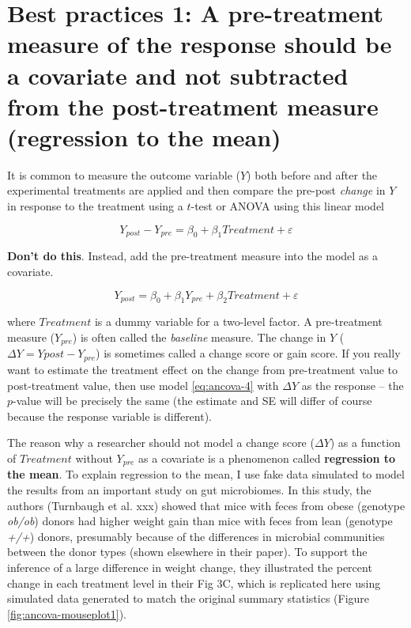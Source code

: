 \documentclass[]{book}
\begin{document}
\section{Best practices 1: A pre-treatment measure of the response
should be a covariate and not subtracted from the post-treatment measure
(regression to the
mean)}\label{best-practices-1-a-pre-treatment-measure-of-the-response-should-be-a-covariate-and-not-subtracted-from-the-post-treatment-measure-regression-to-the-mean}

It is common to measure the outcome variable (\(Y\)) both before and
after the experimental treatments are applied and then compare the
pre-post \emph{change} in \(Y\) in response to the treatment using a
\(t\)-test or ANOVA using this linear model

\begin{equation}
Y_{post}-Y_{pre} = \beta_0 + \beta_1 Treatment + \varepsilon
\label{eq:cov-change-score}
\end{equation}

\textbf{Don't do this}. Instead, add the pre-treatment measure into the
model as a covariate.

\begin{equation}
Y_{post} = \beta_0 + \beta_1 Y_{pre} + \beta_2 Treatment + \varepsilon
\label{eq:ancova-4}
\end{equation}

where \(Treatment\) is a dummy variable for a two-level factor. A
pre-treatment measure (\(Y_{pre}\)) is often called the \emph{baseline}
measure. The change in \(Y\) (\(\Delta Y = Y{post} - Y_{pre}\)) is
sometimes called a change score or gain score. If you really want to
estimate the treatment effect on the change from pre-treatment value to
post-treatment value, then use model \eqref{eq:ancova-4} with \(\Delta Y\)
as the response -- the \(p\)-value will be precisely the same (the
estimate and SE will differ of course because the response variable is
different).

The reason why a researcher should not model a change score
(\(\Delta Y\)) as a function of \(Treatment\) without \(Y_{pre}\) as a
covariate is a phenomenon called \textbf{regression to the mean}. To
explain regression to the mean, I use fake data simulated to model the
results from an important study on gut microbiomes. In this study, the
authors (Turnbaugh et al. xxx) showed that mice with feces from obese
(genotype \emph{ob/ob}) donors had higher weight gain than mice with
feces from lean (genotype \emph{+/+}) donors, presumably because of the
differences in microbial communities between the donor types (shown
elsewhere in their paper). To support the inference of a large
difference in weight change, they illustrated the percent change in each
treatment level in their Fig 3C, which is replicated here using
simulated data generated to match the original summary statistics
(Figure \ref{fig:ancova-mouseplot1}).
\end{document}
